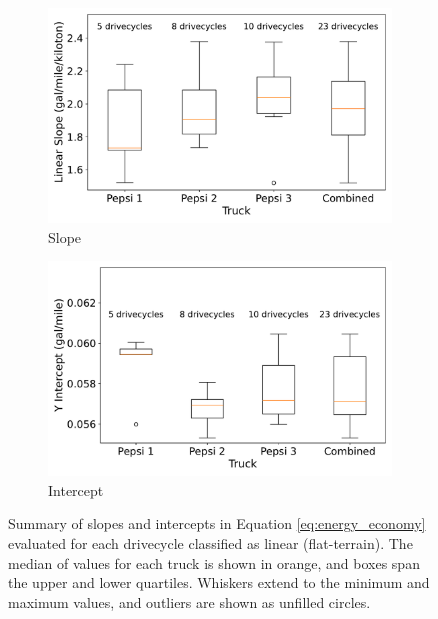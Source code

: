 \begin{figure}[H]
    \centering
    \begin{subfigure}[b]{0.49\textwidth}
        \centering
        \includegraphics[width=\textwidth]{figures/slope_distribution_diesel.pdf}
        \caption{Slope}
        \label{fig:slope_distribution_diesel}
    \end{subfigure}
    \hfill
    \begin{subfigure}[b]{0.49\textwidth}
        \centering
        \includegraphics[width=\textwidth]{figures/intercept_distribution_diesel.pdf}
        \caption{Intercept}
        \label{fig:intercept_distribution_diesel}
    \end{subfigure}
    \caption{Summary of slopes and intercepts in Equation \ref{eq:energy_economy} evaluated for each drivecycle classified as linear (flat-terrain). The median of values for each truck is shown in orange, and boxes span the upper and lower quartiles. Whiskers extend to the minimum and maximum values, and outliers are shown as unfilled circles.}
    \label{fig:slope_intercept_distributions_diesel}
\end{figure}

